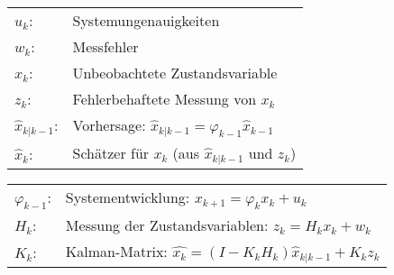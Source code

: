 	\begin{minipage}{8cm}
		\begin{tabular}{ll}
			$u_k$: & Systemungenauigkeiten \\
			$w_k$: & Messfehler \\
			$x_k$: & Unbeobachtete Zustandsvariable \\
			$z_k$: & Fehlerbehaftete Messung von $x_k$ \\
			$\hat{x}_{k|k-1}$: & Vorhersage: $\hat{x}_{k|k-1} = \varphi_{k-1} \hat{x}_{k-1}$\\
			$\hat{x}_k$: & Schätzer für $x_k$ (aus $\hat{x}_{k|k-1}$ und $z_k$)\\
		\end{tabular}
	\end{minipage}
	\begin{minipage}{8cm}
		\begin{tabular}{ll}
			$\varphi_{k-1}$: & Systementwicklung: $x_{k+1}=\varphi_k x_k + u_k$ \\
			$H_k$: & Messung der Zustandsvariablen: $z_k = H_k x_k + w_k$ \\
			$K_k$: & Kalman-Matrix: $\hat{x_k} = (I-K_k H_k)\hat{x}_{k|k-1} + K_k z_k$ \\
		\end{tabular}
	\end{minipage}
	
